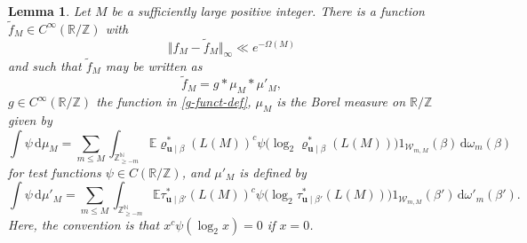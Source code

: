 \documentclass[11pt,reqno]{amsart}
\numberwithin{equation}{section}
\newtheorem{lemma}[theorem]{Lemma}
\theoremstyle{definition}
\theoremstyle{remark}
\newcommand{\mb}{\mathbb}
\newcommand{\mbf}{\mathbf}
\renewcommand{\le}{\leqslant}
\renewcommand{\ge}{\geqslant}
\newcommand\Z{\mathbb{Z}}
\newcommand\R{\mathbb{R}}
\newcommand\N{\mathbb{N}}
\begin{document}
\begin{lemma}
Let $M$ be a sufficiently large positive integer. There is a function $\tilde f_M \in C^{\infty}(\R/\Z)$ with 
\begin{equation}\label{fm-tildefm-approx} \Vert f_M - \tilde f_M \Vert_{\infty} \ll e^{-\Omega(M)}\end{equation}
and such that $\tilde f_M$ may be written as
\begin{equation}\label{fm-conv} \tilde f_M = g \ast \mu_M \ast \mu'_M,\end{equation}
$g \in C^{\infty}(\R/\Z)$ the function in \cref{g-funct-def}, $\mu_M$ is the Borel measure on $\R/\Z$ given by
\begin{equation}\label{mu-m-def} \int \psi \, \mathrm{d}\mu_{M} =  \sum_{m \le M}\int_{\Z^\N_{\ge -m}} \mb{E} \varrho^*_{\mbf{u} \mid \beta}(L(M))^c \psi\big(\log_2 \varrho^*_{\mbf{u} \mid \beta}(L(M))\big)1_{\mathscr{W}_{m,M}}(\beta)\, \mathrm{d}\omega_m(\beta)\end{equation} for test functions $\psi \in C(\R/\Z)$, and $\mu'_M$ is defined by
\begin{equation}\label{mu-m-prime-def} \int \psi \, \mathrm{d}\mu'_{M} =  \sum_{m \le M}\int_{\Z^\N_{\ge -m}} \mb{E} \tau^*_{\mbf{u} \mid \beta'}(L(M))^c \psi\big(\log_2 \tau^*_{\mbf{u} \mid \beta'}(L(M))\big)1_{\mathscr{W}_{m,M}}(\beta')\, \mathrm{d}\omega'_m(\beta').\end{equation} Here, the convention is that $x^c \psi(\log_2 x) = 0$ if $x = 0$.
\end{lemma}
\end{document}
